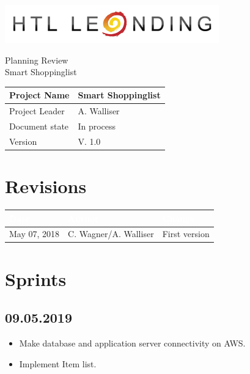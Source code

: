 \documentclass[12pt]{article}
\theoremstyle{definition}
\newcommand{\projectname}{Smart Shoppinglist}
\newcommand{\productname}{Smart Shoppinglist}
\newcommand{\projectleader}{A. Walliser}
\newcommand{\documentstatus}{In process}
\newcommand{\version}{V. 1.0}
\begin{document}
\begin{titlepage}
\begin{flushright}
\includegraphics[scale=.5]{htlleondinglogo.png}\\
\end{flushright}

\vspace{10em}

\begin{center}
{\Huge Planning Review} \\[3em]
{\LARGE \productname} \\[3em]
\end{center}

\begin{flushleft}
\begin{tabular}{|l|l|}
\hline
Project Name & \projectname \\ \hline
Project Leader & \projectleader \\ \hline
Document state & \documentstatus \\ \hline
Version & \version \\ \hline
\end{tabular}
\end{flushleft}

\end{titlepage}
\section*{Revisions}
\begin{tabular}{|l|l|l|}
\hline
\cellcolor[gray]{0.5}\textcolor{white}{Date} & \cellcolor[gray]{0.5}\textcolor{white}{Author} & \cellcolor[gray]{0.5}\textcolor{white}{Change} \\ \hline
May 07, 2018&C. Wagner/A. Walliser&First version \\ \hline
\end{tabular}
\pagebreak

\tableofcontents
\pagebreak

\section{Sprints}

\subsection{09.05.2019}
\begin{itemize}
\item Make database and application server connectivity on AWS.
\item Implement Item list.
\end{itemize}
\end{document}
